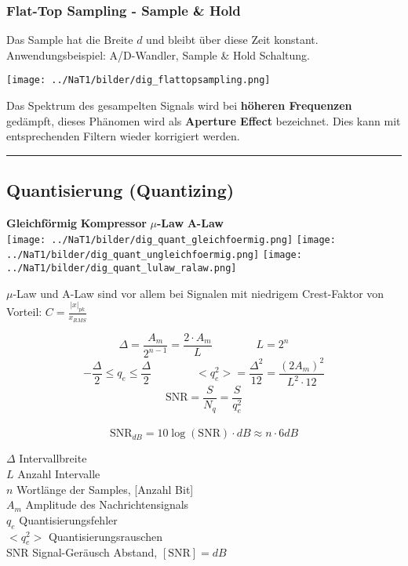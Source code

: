 \subsubsection{Flat-Top Sampling - Sample \& Hold}
Das Sample hat die Breite $d$ und bleibt über diese Zeit konstant. \\
Anwendungsbeispiel: A/D-Wandler, Sample \& Hold Schaltung. \\
	\begin{center}
		\texttt{[image: ../NaT1/bilder/dig\_flattopsampling.png]}
	\end{center}
Das Spektrum des gesampelten Signals wird bei \textbf{höheren Frequenzen} gedämpft, dieses Phänomen
wird als \textbf{Aperture Effect} bezeichnet. Dies kann mit entsprechenden Filtern wieder
korrigiert werden.\\
\hrule
 
\subsection{Quantisierung (Quantizing)}
	\begin{center}	
		\textbf{Gleichförmig} \hspace{3cm}
		\textbf{Kompressor} \hspace{2.9cm}
		\textbf{$\mu$-Law} \hspace{3cm}
		\textbf{A-Law}  \\
		\texttt{[image: ../NaT1/bilder/dig\_quant\_gleichfoermig.png]} \hspace{0.5cm}
		\texttt{[image: ../NaT1/bilder/dig\_quant\_ungleichfoermig.png]} \hspace{0.5cm}
		\texttt{[image: ../NaT1/bilder/dig\_quant\_lulaw\_ralaw.png]}	
	\end{center}
	$\mu$-Law und A-Law sind vor allem bei Signalen mit niedrigem Crest-Faktor von Vorteil: $C = \frac{|x|_{pk}}{x_{RMS}}$

\begin{minipage}{9cm}
	$$ \Delta = \frac{A_m}{2^{n-1}} = \frac{2 \cdot A_m}{L} \qquad \qquad L = 2^n$$ 
	$$ - \frac{\Delta}{2} \leq q_e \leq \frac{\Delta}{2} \qquad \qquad <q_e^2> = \frac{\Delta^2}{12} =
	\frac{(2 A_m)^2}{L^2 \cdot 12}$$ \vspace{0.1cm}
	$$ \text{SNR} =\frac{S}{N_q}= \frac{S}{q_e^2}$$\\
	$$\text{SNR}_{dB}=10 \log(\text{SNR}) \cdot dB \approx n \cdot 6dB$$
\end{minipage}
\begin{minipage}{9cm}
	$\Delta$ Intervallbreite \\
	$L$ Anzahl Intervalle \\
	$n$ Wortlänge der Samples, [Anzahl Bit] \\
	$A_m$ Amplitude des Nachrichtensignals \\
	$q_e$ Quantisierungsfehler \\
	$<q_e^2>$ Quantisierungsrauschen \\
	SNR Signal-Geräusch Abstand, $[\text{SNR}] = dB$
\end{minipage}

